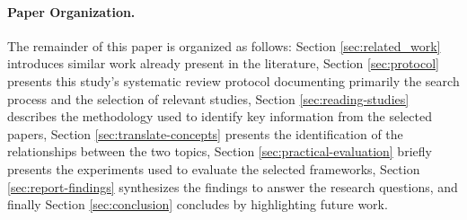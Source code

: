 


\paragraph{Paper Organization.}
The remainder of this paper is organized as follows: Section \ref{sec:related_work} introduces
similar work already present in the literature, Section \ref{sec:protocol} presents this study's
systematic review protocol documenting primarily the search process and the selection of relevant
studies, Section \ref{sec:reading-studies} describes the methodology used to identify key
information from the selected papers, Section \ref{sec:translate-concepts} presents the
identification of the relationships between the two topics, Section \ref{sec:practical-evaluation}
briefly presents the experiments used to evaluate the selected frameworks, Section
\ref{sec:report-findings} synthesizes the findings to answer the research questions, and finally
Section \ref{sec:conclusion} concludes by highlighting future work.

